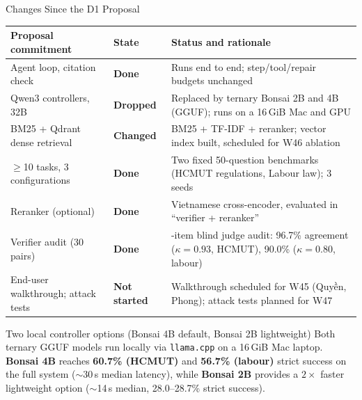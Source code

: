 \documentclass[aspectratio=1610,11pt]{beamer}
\renewcommand{\arraystretch}{1.15}
\begin{document}
\begin{frame}{Changes Since the D1 Proposal}
  \footnotesize\renewcommand{\arraystretch}{1.02}
  \begin{tabularx}{\textwidth}{@{}>{\raggedright\arraybackslash}p{4.0cm}>{\bfseries}p{1.9cm}>{\raggedright\arraybackslash}X@{}}
    \toprule Proposal commitment & State & Status and rationale\\\midrule
    Agent loop, citation check & \textcolor{successgreen}{Done} & Runs end to end; step/tool/repair budgets unchanged\\
    Qwen3 controllers, 32B & \textcolor{dangerred}{Dropped} & Replaced by ternary Bonsai 2B and 4B (GGUF); runs on a 16\,GiB Mac and GPU\\
    BM25 + Qdrant dense retrieval & \textcolor{warnorange}{Changed} & BM25 + TF-IDF + reranker; vector index built, scheduled for W46 ablation\\
    $\ge$10 tasks, 3 configurations & \textcolor{successgreen}{Done} & Two fixed 50-question benchmarks (HCMUT regulations, Labour law); 3 seeds\\
    Reranker (optional) & \textcolor{successgreen}{Done} & Vietnamese cross-encoder, evaluated in ``verifier + reranker''\\
    Verifier audit (30 pairs) & \textcolor{successgreen}{Done} & 60-item blind judge audit: 96.7\% agreement ($\kappa=0.93$, HCMUT), 90.0\% ($\kappa=0.80$, labour)\\
    End-user walkthrough; attack tests & \textcolor{warnorange}{Not started} & Walkthrough scheduled for W45 (Quyền, Phong); attack tests planned for W47\\
    \bottomrule
  \end{tabularx}
  \vspace{3pt}

  \begin{block}{Two local controller options (Bonsai 4B default, Bonsai 2B lightweight)}
    \scriptsize Both ternary GGUF models run locally via \texttt{llama.cpp} on a 16\,GiB Mac laptop. \textbf{Bonsai 4B} reaches \textbf{60.7\% (HCMUT)} and \textbf{56.7\% (labour)} strict success on the full system ($\sim$30\,s median latency), while \textbf{Bonsai 2B} provides a $2\times$ faster lightweight option ($\sim$14\,s median, 28.0--28.7\% strict success).
  \end{block}
\end{frame}
\end{document}
